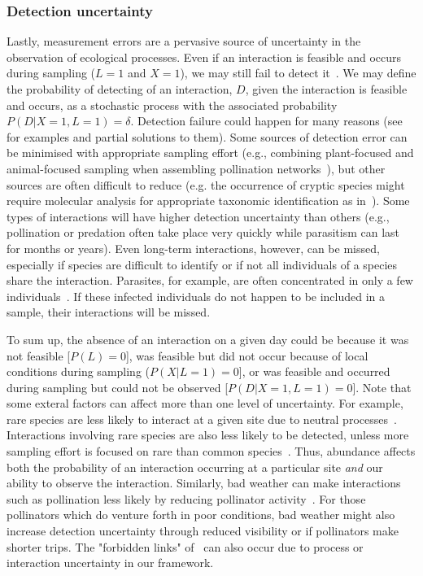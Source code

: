 \documentclass[12pt]{article}
\begin{document}
\begin{spacing}{2.0}
        \subsubsection*{Detection uncertainty} 

          Lastly, measurement errors are a pervasive source of uncertainty in the observation of ecological processes. Even if an interaction is feasible and occurs during sampling ($L = 1$ and $X = 1$), we may still fail to detect it~\citep{Jordano2016,Weinstein2017}. We may define the probability of detecting of an interaction, $D$, given the interaction is feasible and occurs, as a stochastic process with the associated probability $P(D|X=1,L=1)=\delta$. Detection failure could happen for many reasons (see~\citet{Wirta2014} for examples and partial solutions to them). Some sources of detection error can be minimised with appropriate sampling effort (e.g., combining plant-focused and animal-focused sampling when assembling pollination networks~\citet{Jordano2016}), but other sources are often difficult to reduce (e.g. the occurrence of cryptic species might require molecular analysis for appropriate taxonomic identification as in~\citealt{Wirta2014,Frost2016}). Some types of interactions will have higher detection uncertainty than others (e.g., pollination or predation often take place very quickly while parasitism can last for months or years). Even long-term interactions, however, can be missed, especially if species are difficult to identify or if not all individuals of a species share the interaction. Parasites, for example, are often concentrated in only a few individuals~\citep{Lagrue2017}. If these infected individuals do not happen to be included in a sample, their interactions will be missed.


      To sum up, the absence of an interaction on a given day could  be because it was not feasible [$P(L) = 0$], was feasible but did not occur because of local conditions during sampling ($P(X|L=1) = 0$], or was feasible and occurred during sampling but could not be observed [$P(D|X=1,L=1)=0$]. Note that some exteral factors can affect more than one level of uncertainty. For example, rare species are less likely to interact at a given site due to neutral processes~\citep{}. Interactions involving rare species are also less likely to be detected, unless more sampling effort is focused on rare than common species~\citep{Jordano2016}. Thus, abundance affects both the probability of an interaction occurring at a particular site \emph{and} our ability to observe the interaction. Similarly, bad weather can make interactions such as pollination less likely by reducing pollinator activity~\citep{}. For those pollinators which do venture forth in poor conditions, bad weather might also  increase detection uncertainty through reduced visibility or if pollinators make shorter trips. The "forbidden links" of~\citet{Jordano2016} can also occur due to process or interaction uncertainty in our framework. 



\end{spacing}
\end{document}
